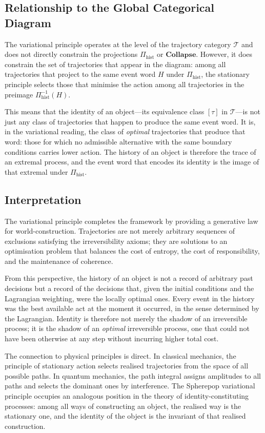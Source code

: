 \documentclass[12pt]{article}
\theoremstyle{plain}
\theoremstyle{definition}
\theoremstyle{remark}
\newcommand{\Collapse}{\mathbf{Collapse}}
\begin{document}
\subsection{Relationship to the Global Categorical Diagram}

The variational principle operates at the level of the trajectory category
$\mathcal{T}$ and does not directly constrain the projections $\Pi_{\mathrm{hist}}$
or $\Collapse$.  However, it does constrain the set of trajectories that appear
in the diagram: among all trajectories that project to the same event word $H$
under $\Pi_{\mathrm{hist}}$, the stationary principle selects those that
minimise the action among all trajectories in the preimage $\Pi_{\mathrm{hist}}^{-1}(H)$.

This means that the identity of an object---its equivalence class $[\tau]$ in
$\mathcal{T}$---is not just any class of trajectories that happen to produce the
same event word.  It is, in the variational reading, the class of
\emph{optimal} trajectories that produce that word: those for which no
admissible alternative with the same boundary conditions carries lower action.
The history of an object is therefore the trace of an extremal process, and
the event word that encodes its identity is the image of that extremal under
$\Pi_{\mathrm{hist}}$.

\subsection{Interpretation}

The variational principle completes the framework by providing a generative law
for world-construction.  Trajectories are not merely arbitrary sequences of
exclusions satisfying the irreversibility axioms; they are solutions to an
optimisation problem that balances the cost of entropy, the cost of
responsibility, and the maintenance of coherence.

From this perspective, the history of an object is not a record of arbitrary
past decisions but a record of the decisions that, given the initial conditions
and the Lagrangian weighting, were the locally optimal ones.  Every event in
the history was the best available act at the moment it occurred, in the sense
determined by the Lagrangian.  Identity is therefore not merely the shadow of an
irreversible process; it is the shadow of an \emph{optimal} irreversible process,
one that could not have been otherwise at any step without incurring higher total
cost.

The connection to physical principles is direct.  In classical mechanics, the
principle of stationary action selects realised trajectories from the space of
all possible paths.  In quantum mechanics, the path integral assigns amplitudes
to all paths and selects the dominant ones by interference.  The Spherepop
variational principle occupies an analogous position in the theory of
identity-constituting processes: among all ways of constructing an object,
the realised way is the stationary one, and the identity of the object is the
invariant of that realised construction.
\end{document}
